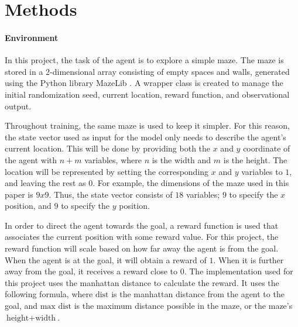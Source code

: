 \documentclass[12pt]{article}
\begin{document}
%

\section{Methods}


\paragraph{Environment}

In this project, the task of the agent is to explore a simple maze.
The maze is stored in a 2-dimensional array consisting of empty spaces and walls, generated using the Python \cite{lang_python} library MazeLib \cite{lib_mazelib}.
A wrapper class is created to manage the initial randomization seed, current location, reward function, and observational output.

Throughout training, the same maze is used to keep it simpler.
For this reason, the state vector used as input for the model only needs to describe the agent's current location.
This will be done by providing both the $x$ and $y$ coordinate of the agent with $n + m$ variables, where $n$ is the width and $m$ is the height.
The location will be represented by setting the corresponding $x$ and $y$ variables to $1$, and leaving the rest as $0$.
For example, the dimensions of the maze used in this paper is $9x9$.
Thus, the state vector consists of $18$ variables; $9$ to specify the $x$ position, and $9$ to specify the $y$ position.

In order to direct the agent towards the goal, a reward function is used that associates the current position with some reward value.
For this project, the reward function will scale based on how far away the agent is from the goal.
When the agent is at the goal, it will obtain a reward of $1$. When it is further away from the goal, it receives a reward close to $0$.
The implementation used for this project uses the manhattan distance to calculate the reward.
It uses the following formula, where $\text{dist}$ is the manhattan distance from the agent to the goal, and $\text{max dist}$ is the maximum distance possible in the maze, or the maze's $\text{height} + \text{width}$.
\end{document}
